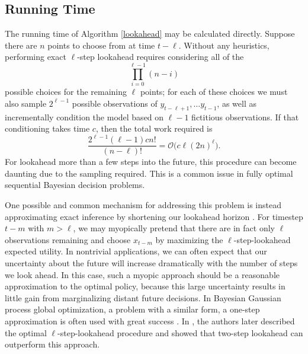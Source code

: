 \documentclass{acm_proc_article-sp}
\newcommand{\cm}[1]{\mathcal{#1}}
\begin{document}
\subsection{Running Time}
\label{runningtime}

The running time of Algorithm \ref{lookahead} may be calculated
directly.  Suppose there are $n$ points to choose from at time $t -
\ell$.  Without any heuristics, performing exact $\ell$-step lookahead
requires considering all of the
\begin{equation*}
  \prod_{i = 0}^{\ell-1} (n - i)
\end{equation*}
possible choices for the remaining $\ell$ points; for each of these
choices we must also sample $2^{\ell - 1}$ possible observations of
$y_{t-\ell + 1}, \dotsc y_{t-1}$, as well as incrementally condition
the model based on $\ell - 1$ fictitious observations.  If that
conditioning takes time $c$, then the total work required is
\begin{equation*}
  \frac{2^{\ell - 1} (\ell-1)c n!}{(n - \ell)!} 
  = 
  \cm{O}\bigl(c\ell(2n)^\ell\bigr).
\end{equation*}
For lookahead more than a few steps into the future, this procedure
can become daunting due to the sampling required.  This is a common
issue in fully optimal sequential Bayesian decision problems.

One possible and common mechanism for addressing this problem is
instead approximating exact inference by shortening our lookahead
horizon \citep{ego, gpgo}.  For timestep $t - m$ with $m > \ell$, we
may myopically pretend that there are in fact only $\ell$ observations
remaining and choose $x_{t-m}$ by maximizing the $\ell$-step-lookahead
expected utility.  In nontrivial applications, we can often expect
that our uncertainty about the future will increase dramatically with
the number of steps we look ahead. In this case, such a myopic
approach should be a reasonable approximation to the optimal policy,
because this large uncertainty results in little gain from
marginalizing distant future decisions.  In Bayesian Gaussian process
global optimization, a problem with a similar form, a one-step
approximation is often used with great success \citep{ego}.  In
\citep{gpgo}, the authors later described the optimal
$\ell$-step-lookahead procedure and showed that two-step lookahead
can outperform this approach.
\end{document}
